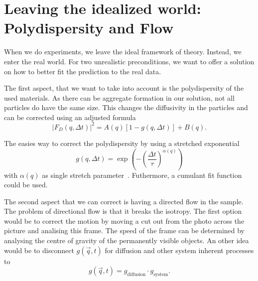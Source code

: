 \section[Polydispersity and Flow]{Leaving the idealized world: Polydispersity and Flow}
\label{sec:PoldysAndFlow}

When we do experiments, we leave the ideal framework of theory. Instead, we enter the real world. For two unrealistic 
preconditions, we want to offer a solution on how to better fit the prediction to the real data.

The first aspect, that we want to take into account is the polydispersity of the 
used materials. As there can be aggregate formation in our solution, not all particles do have the
same size. This changes the diffusivity in the particles and can be corrected using an adjusted 
formula 
\begin{equation}
    |F_D(q,\Delta t)|^2 = A(q)[1- g(q, \Delta t)] +B(q).
\end{equation}

The easies way to correct the polydispersity by using a stretched exponential
\begin{equation}
    g(q,\Delta t) = \exp(-\left(\frac{\Delta t}{\tau}\right)^{\alpha (q)})
\end{equation}
with $\alpha (q) $ as single stretch parameter~\cite{Wulstein.2016}. Futhermore, a cumulant fit function could be used.

The second aspect that we can correct is having a directed flow in the sample. The problem of directional flow is that it breaks the isotropy. 
The first option would be to correct the motion by moving a cut out from the photo across the picture and analising this 
frame. The speed of the frame can be determined by analysing the centre of gravity of the permanently visible objects. 
An other idea would be to disconnect $g(\vec{q}, t)$ for diffusion and other system inherent processes to 
\begin{equation}
    g(\vec{q}, t) = g_{\mathrm{diffusion}} \cdot g_{\mathrm{system}} .
\end{equation}